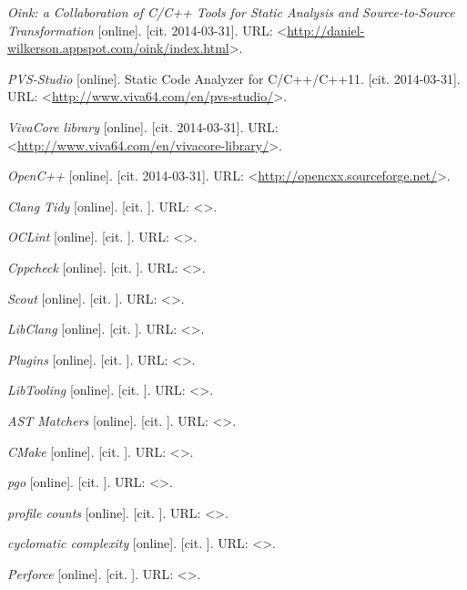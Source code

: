 \begin{thebibliography}{99}
	\emph{Oink: a Collaboration of C/C++ Tools for Static Analysis and Source-to-Source Transformation} [online].
	[cit. 2014-03-31].
	URL: <\url{http://daniel-wilkerson.appspot.com/oink/index.html}>.
	
	\emph{PVS-Studio} [online].
	Static Code Analyzer for C/C++/C++11.
	[cit. 2014-03-31].
	URL: <\url{http://www.viva64.com/en/pvs-studio/}>.	
	
	\emph{VivaCore library} [online].
	[cit. 2014-03-31].
	URL: <\url{http://www.viva64.com/en/vivacore-library/}>.

	\emph{OpenC++} [online].
	[cit. 2014-03-31].
	URL: <\url{http://opencxx.sourceforge.net/}>.
	
	\emph{Clang Tidy} [online].
	[cit. ].
	URL: <\url{}>.
	
	\emph{OCLint} [online].
	[cit. ].
	URL: <\url{}>.
	
	\emph{Cppcheck} [online].
	[cit. ].
	URL: <\url{}>.
	
	\emph{Scout} [online].
	[cit. ].
	URL: <\url{}>.
	
	\emph{LibClang} [online].
	[cit. ].
	URL: <\url{}>.
	
	\emph{Plugins} [online].
	[cit. ].
	URL: <\url{}>.
	
	\emph{LibTooling} [online].
	[cit. ].
	URL: <\url{}>.
	
	\emph{AST Matchers} [online].
	[cit. ].
	URL: <\url{}>.
	
	\emph{CMake} [online].
	[cit. ].
	URL: <\url{}>.
	
	\emph{pgo} [online].
	[cit. ].
	URL: <\url{}>.
	
	\emph{profile counts} [online].
	[cit. ].
	URL: <\url{}>.
	
	\emph{cyclomatic complexity} [online].
	[cit. ].
	URL: <\url{}>.
	
	\emph{Perforce} [online].
	[cit. ].
	URL: <\url{}>.
	
\end{thebibliography}
